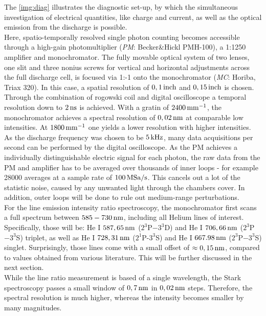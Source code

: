 \documentclass[a4paper,10pt]{article}
\newcommand{\tilt}[1]{\textit{#1}}
\begin{document}
			The \autoref{img:diag} illustrates the diagnostic set-up, by which the simultaneous investigation of electrical quantities, like charge and current, as well as the optical emission from the discharge is possible.\\			Here, spatio-temporally resolved single photon counting becomes accessible through a high-gain photomultiplier (\tilt{PM}: Becker\&Hickl PMH-100), a 1:1250 amplifier and monochromator. The fully movable optical system of two lenses, one slit and three nonius screws for vertical and horizontal adjustments across the full discharge cell, is focused via 1:-1 onto the monochromator (\tilt{MC}: Horiba, Triax 320). In this case, a spatial resolution of $\unit[0,1]{inch}$ and $\unit[0,15]{inch}$ is chosen. Through the combination of rogowski coil and digital oscilloscope a temporal resolution down to $\unit[2]{ns}$ is achieved. With a gratin of $\unit[2400]{mm^{-1}}$, the monochromator achieves a spectral resolution of $\unit[0,02]{nm}$ at comparable low intensities. At $\unit[1800]{mm^{-1}}$ one yields a lower resolution with higher intensities.\\
			As the discharge frequency was chosen to be $\unit[5]{kHz}$, many data acquisitions per second can be performed by the digital oscilloscope. As the PM achieves a individually distinguishable electric signal for each photon, the raw data from the PM and amplifier has to be averaged over thousands of inner loops - for example 28000 averages at a sample rate of $\unit[100]{MSa/s}$. This cancels out a lot of the statistic noise, caused by any unwanted light through the chambers cover. In addition, outer loops will be done to rule out medium-range perturbations.\\
			For the line emission intensity ratio spectroscopy, the monochromator first scans a full spectrum between $\unit[585-730]{nm}$, including all Helium lines of interest. Specifically, those will be: He I $\unit[587,65]{nm}$ ($2^3$P$-3^3$D) and He I $\unit[706,66]{nm}$ ($2^3$P$-3^3$S) triplet, as well as He I $\unit[728,31]{nm}$ ($2^1$P-$3^3$S) and He I $\unit[667.98]{nm}$ ($2^3$P$-3^3$S) singlet. Surprisingly, those lines come with a small offset of $\approx\unit[0,15]{nm}$, compared to values obtained from various literature. This will be further discussed in the next section.\\
			While the line ratio measurement is based of a single wavelength, the Stark spectroscopy passes a small window of $\unit[0,7]{nm}$ in $\unit[0,02]{nm}$ steps. Therefore, the spectral resolution is much higher, whereas the intensity becomes smaller by many magnitudes.\\
\end{document}
